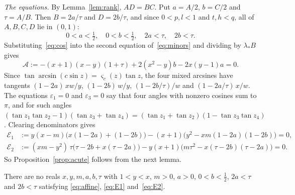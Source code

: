 \emph{The equations.} By Lemma~\ref{lem:rank}, $AD=BC$. Put $a=A/2$, $b=C/2$
and $\tau=A/B$. Then $B=2a/\tau$ and $D=2b/\tau$, and since $0<p,l<1$ and
$t,h<q$, all of $A,B,C,D$ lie in $(0,1)$:
\begin{equation}\label{eq:ranges}
  0<a<\tfrac12,\quad 0<b<\tfrac12,\quad 2a<\tau,\quad 2b<\tau .
\end{equation}
Substituting~\eqref{eq:cos} into the second equation of~\eqref{eq:minors}
and dividing by $\lambda_*B$ gives
\begin{equation}\label{eq:affine}
  \mathcal A:=-(x+1)(x-y)(1+\tau)+2(x^2-y)b-2x(y-1)a=0 .
\end{equation}
Since $\tan\arcsin(c\sin z)=\varsigma_c(z)\tan z$, the four mixed arcsines
have tangents $(1-2a)\,xw/y$, $(1-2b)\,w/y$, $(1-2b/\tau)/w$ and
$(1-2a/\tau)\,x/w$. The equations $\varepsilon_1=0$ and $\varepsilon_3=0$ say
that four angles with nonzero cosines sum to $\pi$, and for such angles
$(\tan z_1\tan z_2-1)(\tan z_3+\tan z_4)=(\tan z_1+\tan z_2)(1-\tan z_3\tan z_4)$.
Clearing denominators gives
\begin{align}
  \mathcal E_1&:=y(x-m)\bigl(x(1-2a)+(1-2b)\bigr)
     -(x+1)\bigl(y^2-xm(1-2a)(1-2b)\bigr)=0,\label{eq:E1}\\
  \mathcal E_2&:=(xm-y^2)\,\tau\bigl(\tau-2b+x(\tau-2a)\bigr)
     -y(x+1)\bigl(m\tau^2-x(\tau-2b)(\tau-2a)\bigr)=0.\label{eq:E2}
\end{align}
So Proposition~\ref{prop:acute} follows from the next lemma.

\begin{lemma}\label{lem:elim}
There are no reals $x,y,m,a,b,\tau$ with $1<y<x$, $m>0$,
$a>0$, $0<b<\tfrac12$, $2a<\tau$ and $2b<\tau$ satisfying
\eqref{eq:affine}, \eqref{eq:E1} and~\eqref{eq:E2}.
\end{lemma}

